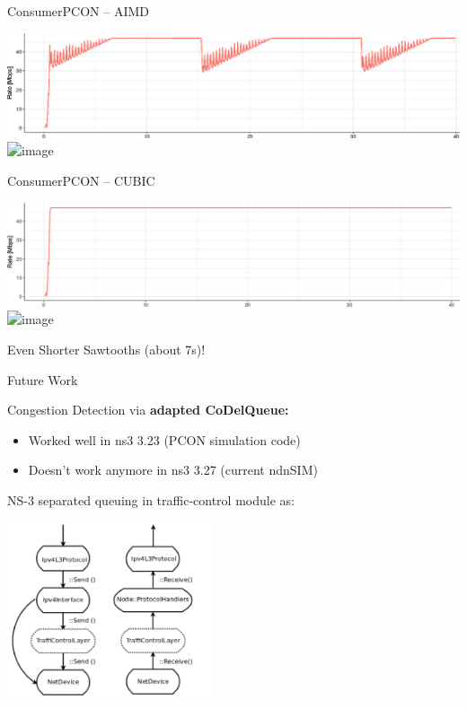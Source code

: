 \begin{frame}{ConsumerPCON -- AIMD}

\includegraphics[width=\linewidth]{figs/cons_pcon_rate.png}\\
\pause
\includegraphics<1-2>[width=\linewidth]{figs/cons_pcon_queue.png}

\end{frame}


\begin{frame}{ConsumerPCON -- CUBIC}

\includegraphics[width=\linewidth]{figs/cons_cubic_rate.png}\\
\pause
\includegraphics<1-2>[width=\linewidth]{figs/cons_cubic_queue.png}

Even Shorter Sawtooths (about 7s)!

\end{frame}


\begin{frame}{Future Work}

Congestion Detection via \textbf{adapted CoDelQueue:}
\begin{itemize}
\item Worked well in ns3 3.23 (PCON simulation code)
\pause
\item Doesn't work anymore in ns3 3.27 (current ndnSIM)
\end{itemize}

\pause
NS-3 separated queuing in traffic-control module as:

\centering
\includegraphics[height=150pt]{figs/ns3-queue.png}
\end{frame}


